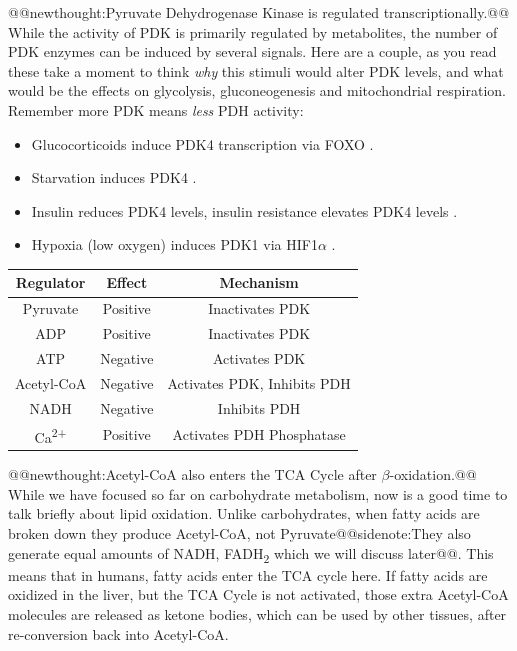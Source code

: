 \documentclass{tufte-handout}
\makeatletter
\def\newthought#1{@@newthought:#1@@}
\def\sidenote#1{@@sidenote:#1@@}
\makeatother
\begin{document}
\newthought{Pyruvate Dehydrogenase Kinase is regulated transcriptionally.}  While the activity of PDK is primarily regulated by metabolites, the number of PDK enzymes can be induced by several signals.  Here are a couple, as you read these take a moment to think \emph{why} this stimuli would alter PDK levels, and what would be the effects on glycolysis, gluconeogenesis and mitochondrial respiration.  Remember more PDK means \emph{less} PDH activity:

\begin{itemize}
	\item Glucocorticoids induce PDK4 transcription via FOXO \citep{Connaughton2010a}.
	\item Starvation induces PDK4 \citep{WU1998}.
	\item Insulin reduces PDK4 levels, insulin resistance elevates PDK4 levels \citep{Harris2001}.
	\item Hypoxia (low oxygen) induces PDK1 via HIF1$\alpha$ \citep{Kim2006}.
\end{itemize}

\begin{margintable}
\centering
\caption{Regulators of Pyruvate Dehydrogenase.}
\label{tab:pdh-regulators}
\begin{tabular}{ccc}
\hline
\textbf {Regulator} & \textbf{Effect} &\textbf{Mechanism}  \\
\hline
Pyruvate & Positive & Inactivates PDK\\
ADP & Positive & Inactivates PDK\\
ATP & Negative & Activates PDK\\
Acetyl-CoA & Negative &  Activates PDK, Inhibits PDH\\
NADH & Negative & Inhibits PDH\\
Ca\textsuperscript{2+} &  Positive & Activates PDH Phosphatase \\
\hline
\end{tabular}
\end{margintable}

\newthought{Acetyl-CoA also enters the TCA Cycle after $\beta$-oxidation.}  While we have focused so far on carbohydrate metabolism, now is a good time to talk briefly about lipid oxidation.  Unlike carbohydrates, when fatty acids are broken down they produce Acetyl-CoA, not Pyruvate\sidenote{They also generate equal amounts of NADH, FADH\textsubscript{2} which we will discuss later}.  This means that in humans, fatty acids enter the TCA cycle here.  If fatty acids are oxidized in the liver, but the TCA Cycle is not activated, those extra Acetyl-CoA molecules are released as ketone bodies, which can be used by other tissues, after re-conversion back into Acetyl-CoA.
\end{document}

